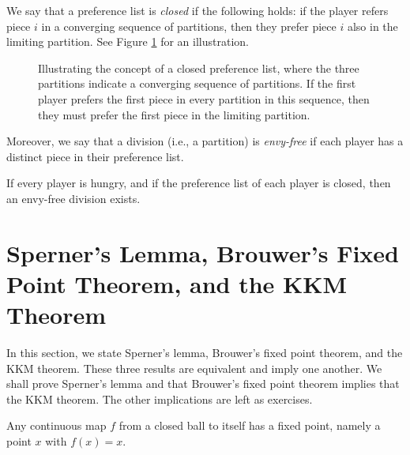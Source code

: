 \documentclass[letterpaper, reqno,12pt]{article}
\begin{document}
We say that a preference list is \emph{closed} if the following holds: if the player refers piece $i$ in a converging sequence of partitions, then they prefer piece $i$ also in the limiting partition. See Figure \ref{fig:closed} for an illustration.

\begin{figure}[h]
  \centering
  \caption{Illustrating the concept of a closed preference list, where the three partitions indicate a converging sequence of partitions. If the first player prefers the first piece in every partition in this sequence, then they must prefer the first piece in the limiting partition.}
  \label{fig:closed}
\end{figure}

Moreover, we say that a division (i.e., a partition) is \emph{envy-free} if each player has a distinct piece in their preference list.

\begin{theorem}[Su, 1980]
  If every player is hungry, and if the preference list of each player is closed, then an envy-free division exists.
\end{theorem}

\section{Sperner's Lemma, Brouwer's Fixed Point Theorem, and the KKM Theorem}

In this section, we state Sperner's lemma, Brouwer's fixed point theorem, and the KKM theorem. These three results are equivalent and imply one another. We shall prove Sperner's lemma and that Brouwer's fixed point theorem implies that the KKM theorem. The other implications are left as exercises.

\begin{theorem}[Brouwer, 1914]
  Any continuous map $f$ from a closed ball to itself has a fixed point, namely a point $x$ with $f(x) = x$.
\end{theorem}
\end{document}
